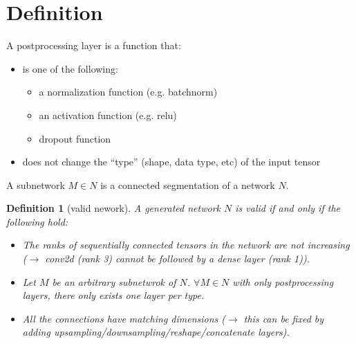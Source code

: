\documentclass[12pt]{article}
\newtheorem{definition}{Definition}
\begin{document}
\maketitle


\section{Definition}

A postprocessing layer is a function that:
\begin{itemize}
\item is one of the following:
  \begin{itemize}
  \item a normalization function (e.g. batchnorm)
  \item an activation function (e.g. relu)
  \item dropout function
  \end{itemize}
\item does not change the ``type'' (shape, data type, etc) of the input tensor
\end{itemize}

A subnetwork $M\in N$ is a connected segmentation of a network $N$.

\begin{definition}[valid nework]
  A generated network $N$ is valid if and only if the following hold:
  \begin{itemize}
    \item The ranks of sequentially connected tensors in the network are not increasing ($\rightarrow$ conv2d (rank 3) cannot be followed by a dense layer (rank 1)).
  \item Let $M$ be an arbitrary subnetwrok of $N$. $\forall M\in N$ with only postprocessing layers, there only exists one layer per type.
  \item All the connections have matching dimensions ($\rightarrow$ this can be fixed by adding upsampling/downsampling/reshape/concatenate layers).
    \end{itemize}
  \end{definition}



\end{document}
